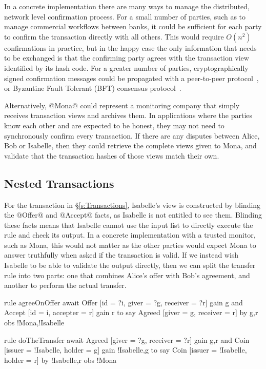 In a concrete implementation there are many ways to manage the distributed, network level confirmation process. For a small number of parties, such as to manage commercial workflows between banks, it could be sufficient for each party to confirm the transaction directly with all others. This would require $O(n^2)$ confirmations in practice, but in the happy case the only information that needs to be exchanged is that the confirming party agrees with the transaction view identified by its hash code. For a greater number of parties, cryptographically signed confirmation messages could be propagated with a peer-to-peer protocol~\cite{El-Ansary2003:Broadcast}, or Byzantine Fault Tolerant (BFT) consensus protocol~\cite{Lamport1982:Byzantine, Ongaro2014:Consensus, Gilad2017:Algorand}.

Alternatively, @Mona@ could represent a monitoring company that simply receives transaction views and archives them. In applications where the parties know each other and are expected to be honest, they may not need to synchronously confirm every transaction. If there are any disputes between Alice, Bob or Isabelle, then they could retrieve the complete views given to Mona, and validate that the transaction hashes of those views match their own.

\eject{}
\subsection{Nested Transactions}
\label{s:NestedTransactions}
For the transaction in \S\ref{s:Transactions}, Isabelle's view is constructed by blinding the @Offer@ and @Accept@ facts, as Isabelle is not entitled to see them. Blinding these facts means that Isabelle cannot use the input list to directly execute the rule and check its output. In a concrete implementation with a trusted monitor, such as Mona, this would not matter as the other parties would expect Mona to answer truthfully when asked if the transaction is valid. If we instead wish Isabelle to be able to validate the output directly, then we can split the transfer rule into two parts: one that combines Alice's offer with Bob's agreement, and another to perform the actual transfer.

\begin{small}
\begin{code}
  rule  agreeOnOffer
  await Offer  [id = ?i, giver = ?g, receiver = ?r] gain {g}
    and Accept [id = i,  accepter = r]              gain {r}
  to
    say Agreed [giver = g, receiver = r]
     by {g,r}  obs {!Mona,!Isabelle}

  rule  doTheTransfer
  await Agreed [giver = ?g, receiver = ?r]        gain {g,r}
   and  Coin   [issuer = !Isabelle, holder = g]
        gain {!Isabelle,g}
  to
    say Coin   [issuer = !Isabelle, holder = r]
     by {!Isabelle,r} obs {!Mona}
\end{code}
\end{small}

